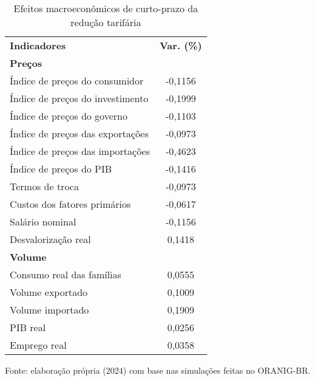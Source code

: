 \begin{table}[h]
	\centering
	\small
	\begin{threeparttable}
		\caption{Efeitos macroeconômicos de curto-prazo da redução tarifária} \label{tab:result}
		\begin{tabular}{m{11cm}c}
			\hline
			\multirow{2}{*}{\textbf{Indicadores}} & \multirow{2}{*}{\textbf{Var. (\%)}} \\
			 &  \\ \hline
			\textbf{Preços} &  \\
			\hspace{0.2cm} Índice de preços do consumidor & -0,1156 \\
			\hspace{0.2cm} Índice de preços do investimento & -0,1999 \\
			\hspace{0.2cm} Índice de preços do governo & -0,1103 \\
			\hspace{0.2cm} Índice de preços das exportações & -0,0973 \\
			\hspace{0.2cm} Índice de preços das importações & -0,4623 \\
			\hspace{0.2cm} Índice de preços do PIB & -0,1416 \\
			\hspace{0.2cm} Termos de troca & -0,0973 \\
			\hspace{0.2cm} Custos dos fatores primários & -0,0617 \\
			\hspace{0.2cm} Salário nominal & -0,1156 \\
			\hspace{0.2cm} Desvalorização real & 0,1418 \\ \hline
			\textbf{Volume} &  \\
			\hspace{0.2cm} Consumo real das famílias & 0,0555 \\
			\hspace{0.2cm} Volume exportado & 0,1009 \\
			\hspace{0.2cm} Volume importado & 0,1909 \\
			\hspace{0.2cm} PIB real & 0,0256 \\
			\hspace{0.2cm} Emprego real & 0,0358 \\ \hline
			\end{tabular}
	\begin{tablenotes}
		\footnotesize
		\item Fonte: elaboração própria (2024) com base nas simulações feitas no ORANIG-BR.
	\end{tablenotes}
	\end{threeparttable}
\end{table}

